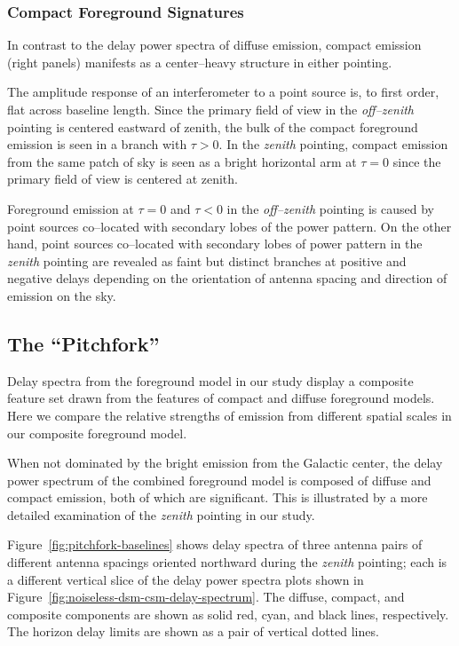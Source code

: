 \documentclass[preprint2,iop,numberedappendix,twocolappendix,appendixfloats]{emulateapj}
\begin{document}
\subsubsection{Compact Foreground Signatures}\label{sec:compact}

In contrast to the delay power spectra of diffuse emission, compact emission (right panels) manifests as a center--heavy structure in either pointing. 

The amplitude response of an interferometer to a point source is, to first order, flat across baseline length. Since the primary field of view in the {\it off--zenith} pointing is centered eastward of zenith, the bulk of the compact foreground emission is seen in a branch with $\tau>0$. In the {\it zenith} pointing, compact emission from the same patch of sky is seen as a bright horizontal arm at $\tau=0$ since the primary field of view is centered at zenith. 

Foreground emission at $\tau=0$ and $\tau<0$ in the {\it off--zenith} pointing is caused by point sources co--located with secondary lobes of the power pattern. On the other hand, point sources co--located with secondary lobes of power pattern in the {\it zenith} pointing are revealed as faint but distinct branches at positive and negative delays depending on the orientation of antenna spacing and direction of emission on the sky. 

\subsection{The ``Pitchfork''}\label{sec:composite}

Delay spectra from the foreground model in our study display a composite feature set drawn from the features of compact and diffuse foreground models. Here we compare the relative strengths of emission from different spatial scales in our composite foreground model. 

When not dominated by the bright emission from the Galactic center, the delay power spectrum of the combined foreground model is composed of diffuse and compact emission, both of which are significant. This is illustrated by a more detailed examination of the {\it zenith} pointing in our study. 

Figure~\ref{fig:pitchfork-baselines} shows delay spectra of three antenna pairs of different antenna spacings oriented northward during the {\it zenith} pointing; each is a different vertical slice of the delay power spectra plots shown in Figure~\ref{fig:noiseless-dsm-csm-delay-spectrum}. The diffuse, compact, and composite components are shown as solid red, cyan, and black lines, respectively. The horizon delay limits are shown as a pair of vertical dotted lines. %
\end{document}
